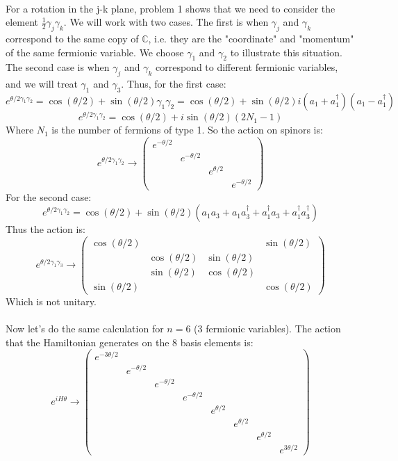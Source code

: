 \documentclass[12 pt]{article}
\begin{document}
\\
For a rotation in the j-k plane, problem 1 shows that we need to consider the element $\frac{1}{2}\gamma_j\gamma_k$. We will work with two cases. The first is when $\gamma_j$ and $\gamma_k$ correspond to the same copy of $\mathbb{C}$, i.e. they are the "coordinate" and "momentum" of the same fermionic variable. We choose $\gamma_1$ and $\gamma_2$ to illustrate this situation. The second case is when $\gamma_j$ and $\gamma_k$ correspond to different fermionic variables, and we will treat $\gamma_1$ and $\gamma_3$. Thus, for the first case:
\[    e^{\theta/2 \gamma_1 \gamma_2} =  \cos(\theta/2) + \sin(\theta/2) \gamma_1\gamma_2 =  \cos(\theta/2) + \sin(\theta/2) i (a_1 + a_1^{\dagger})(a_1-a_1^{\dagger})  \]
\[  e^{\theta/2 \gamma_1 \gamma_2} = \cos(\theta/2) + i \sin(\theta/2)  (2N_1 - 1)  \]
Where $N_1$ is the number of fermions of type 1. So the action on spinors is:
\[  e^{\theta/2 \gamma_1 \gamma_2} \to  \left( \begin{array} {cccc}     e^{-\theta/2} & & & \\ &e^{-\theta/2} & & \\ & &e^{\theta/2} & \\ & & & e^{-\theta/2}      \end{array} \right)   \]
For the second case:
\[   e^{\theta/2 \gamma_1\gamma_2} = \cos(\theta/2) +  \sin(\theta/2) (a_1 a_3 + a_1a_3^{\dagger} + a_1^{\dagger}a_3 + a_1^{\dagger}a_3^{\dagger})    \]
Thus the action is:
\[  e^{\theta/2 \gamma_1 \gamma_3} \to  \left( \begin{array} {cccc}     \cos(\theta/2) & & & \sin(\theta/2) \\ &\cos(\theta/2) & \sin(\theta/2) & \\ & \sin(\theta/2) &\cos(\theta/2) & \\ \sin(\theta/2) & & & \cos(\theta/2)      \end{array} \right)   \]
Which is not unitary.
\\
\\
Now let's do the same calculation for $n=6$ (3 fermionic variables). The action that the Hamiltonian generates on the 8 basis elements is:
\[         e^{iH\theta} \to \left( \begin{array} {cccccccc} e^{-3\theta/2} & & & & & & & \\  &e^{-\theta/2} & & & & & & \\ & & e^{-\theta/2} & & & & & \\ & & &e^{-\theta/2} & & & & \\ & & & &e^{\theta/2} & & & \\ & & & & &e^{\theta/2} & & \\ & & & & & &e^{\theta/2} & \\ & & & & & & & e^{3\theta/2}         \end{array}  \right)            \]
\end{document}
